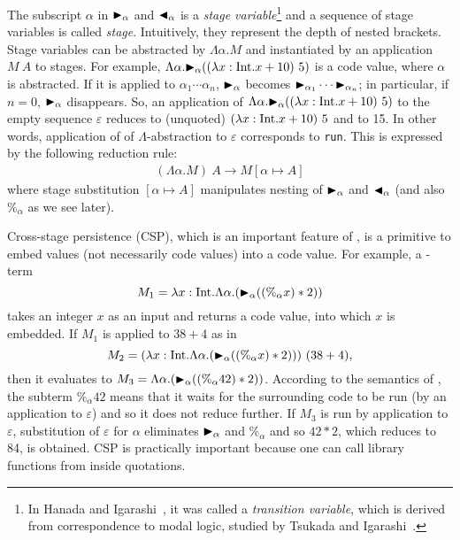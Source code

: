 The subscript $\alpha$ in ${\mathop{\blacktriangleright}}_\alpha$ and ${\mathop{\blacktriangleleft}}_\alpha$ is a \textit{stage
  variable}\footnote{%
  In Hanada and Igarashi~\cite{Hanada2014}, it was called a
  \textit{transition variable}, which is derived from correspondence
  to modal logic, studied by Tsukada and Igarashi~\cite{Tsukada}.} and
a sequence of stage variables is called \textit{stage}.  Intuitively,
they represent the depth of nested brackets.  Stage variables can be
abstracted by $\Lambda\alpha.M$ and instantiated by an application
$M\ A$ to stages.  For example,
$\Lambda\alpha.{\mathop{\blacktriangleright}}_\alpha ((\lambda x:\textrm{Int}.x+10)\ 5)$ is a code value,
where \(\alpha\) is abstracted.  If it is applied to \(\alpha_1 \cdots \alpha_n\), \({\mathop{\blacktriangleright}}_\alpha\) becomes \({\mathop{\blacktriangleright}}_{\alpha_1} \cdots {\mathop{\blacktriangleright}}_{\alpha_n}\); in particular,
if \(n = 0\), \({\mathop{\blacktriangleright}}_\alpha\) disappears.  So, an
application of $\Lambda\alpha.{\mathop{\blacktriangleright}}_\alpha ((\lambda x:\textrm{Int}.x+10)\ 5)$
to the empty sequence \(\varepsilon\) reduces to
(unquoted) \((\lambda x:\textrm{Int}.x+10)\ 5\) and to 15.  In other words, application of of
\(\Lambda\)-abstraction to $\varepsilon$ corresponds to \texttt{run}.
This is expressed by the following reduction rule:
\begin{align*}
	(\Lambda\alpha.M)\ A \longrightarrow M[\alpha\mapsto A]
\end{align*}
where stage substitution \([\alpha \mapsto A]\) manipulates nesting of
\({\mathop{\blacktriangleright}}_\alpha\) and \({\mathop{\blacktriangleleft}}_\alpha\) (and also \(\%_\alpha\) as we see later).

Cross-stage persistence (CSP), which is an important feature of \LTP,
is a primitive to embed values (not necessarily code values) into a
code value.  For example, a \LTP-term
\[
  M_1 = \lambda x:\textrm{Int}.\Lambda\alpha.({\mathop{\blacktriangleright}}_\alpha ((\%_\alpha x) * 2))
\]
takes an integer \(x\) as an input and returns a code value, into
which \(x\) is embedded.  If $M_1$ is applied to $38 + 4$ as in
\[
  M_2 = (\lambda x:\textrm{Int}.\Lambda\alpha.({\mathop{\blacktriangleright}}_\alpha ((\%_\alpha x) * 2)))\ (38 + 4),
\]
then it evaluates to
\(M_3 = \Lambda\alpha.({\mathop{\blacktriangleright}}_\alpha ((\%_\alpha 42) * 2))\).  According
to the semantics of \LTP, the subterm $\%_\alpha 42$ means that it
waits for the surrounding code to be run (by an application to
$\varepsilon$) and so it does not reduce further.  If \(M_3\) is run
by application to \(\varepsilon\), substitution of \(\varepsilon\) for
\(\alpha\) eliminates \({\mathop{\blacktriangleright}}_\alpha\) and \(\%_\alpha\) and so
\(42 * 2\), which reduces to 84, is obtained.
CSP is practically important because
one can call library functions from inside quotations.  

